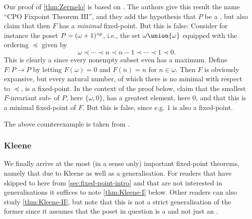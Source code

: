 \begin{remark}
    Our proof of \cref{thm:Zermelo} is based on \textcite[Exercise~8.20]{davey-priestley-order}. The authors give this result the name \enquote{CPO Fixpoint Theorem III}, and they add the hypothesis that $P$ be a \dCPPO, but also claim that then $F$ has a \emph{minimal} fixed-point. But this is false: Consider for instance the poset $P = \protect\dualord*{\omega+1}$, i.e., the set $\omega \union \{\omega\}$ equipped with the ordering $\preceq$ given by
    \begin{equation*}
        \omega \prec \cdots \prec n \prec n-1 \prec \cdots \prec 1 \prec 0.
    \end{equation*}
    This is clearly a \dCPPO{} since every nonempty subset even has a maximum. Define $F \colon P \to P$ by letting $F(\omega) = 0$ and $F(n) = n$ for $n \in \omega$. Then $F$ is obviously expansive, but every natural number, of which there is no minimal with respect to $\preceq$, is a fixed-point. In the context of the proof below, \citeauthor{davey-priestley-order} claim that the smallest $F$-invariant sub-\dCPPO{} of $P$, here $\{\omega, 0\}$, has a greatest element, here $0$, and that this is a minimal fixed-point of $F$. But this is false, since e.g. $1$ is also a fixed-point. \par The above counterexample is taken from \textcite{hansen-zermelo-stackexchange}.
\end{remark}


\subsubsection{Kleene}\label{sec:Kleene}

We finally arrive at the most (in a sense only) important fixed-point theorems, namely that due to Kleene as well as a generalisation. For readers that have skipped to here from \cref{sec:fixed-point-intro} and that are not interested in generalisations it suffices to note \cref{thm:Kleene-I} below. Other readers can also study \cref{thm:Kleene-II}, but note that this is not a strict generalisation of the former since it assumes that the poset in question is a \cCPPO{} and not just an \oCPPO.


